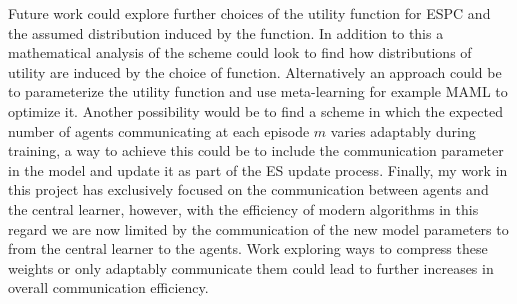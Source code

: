 Future work could explore further choices of the utility function for ESPC and the assumed distribution induced by the function. In addition to this a mathematical analysis of the scheme could look to find how distributions of utility are induced by the choice of function. Alternatively an approach could be to parameterize the utility function and use meta-learning for example MAML \cite{MAML} to optimize it. Another possibility would be to find a scheme in which the expected number of agents communicating at each episode $m$ varies adaptably during training, a way to achieve this could be to include the communication parameter in the model and update it as part of the ES update process. Finally, my work in this project has exclusively focused on the communication between agents and the central learner, however, with the efficiency of modern algorithms in this regard we are now limited by the communication of the new model parameters to from the central learner to the agents. Work exploring ways to compress these weights or only adaptably communicate them could lead to further increases in overall communication efficiency.